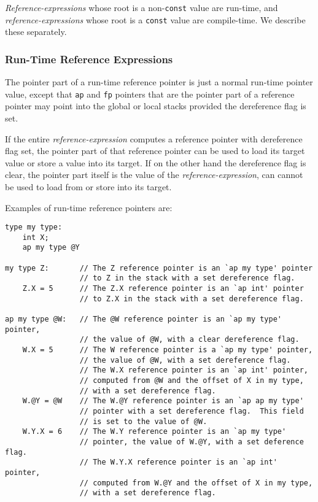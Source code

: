 \documentclass[12pt]{article}
\newenvironment{indpar}[1][0.3in]%
	{\begin{list}{}%
		     {\setlength{\itemsep}{0in}%
		      \setlength{\topsep}{0in}%
		      \setlength{\parsep}{1ex}%
		      \setlength{\labelwidth}{#1}%
		      \setlength{\leftmargin}{#1}%
		      \addtolength{\leftmargin}{\labelsep}}%
	 \item}%
	{\end{list}}
\begin{document}
{\em Reference-expressions} whose root is a non-{\tt const} value are
run-time, and {\em reference-expres\-sions}
whose root is a {\tt const} value are compile-time.
We describe these separately.

\subsubsection{Run-Time Reference Expressions}
\label{RUN-TIME-REFERENCE-EXPRESSIONS}

The pointer part of a run-time reference pointer is just
a normal run-time pointer value, except that
{\tt ap} and {\tt fp} pointers that are the pointer part
of a reference pointer may point
into the global or local stacks provided the dereference flag is set.

If the entire {\em reference-expression} computes a reference pointer
with dereference flag set, the pointer part of that reference pointer
can be used to load its target value or store a value into its target.
If on the other hand the dereference flag is clear, the pointer part
itself is the value of the {\em reference-expression}, can cannot
be used to load from or store into its target.

Examples of run-time reference pointers are:
\begin{indpar}\small\begin{verbatim}
type my type:
    int X;
    ap my type @Y

my type Z:       // The Z reference pointer is an `ap my type' pointer
                 // to Z in the stack with a set dereference flag.
    Z.X = 5      // The Z.X reference pointer is an `ap int' pointer
                 // to Z.X in the stack with a set dereference flag.

ap my type @W:   // The @W reference pointer is an `ap my type' pointer,
                 // the value of @W, with a clear dereference flag.
    W.X = 5      // The W reference pointer is a `ap my type' pointer,
                 // the value of @W, with a set dereference flag.
                 // The W.X reference pointer is an `ap int' pointer,
                 // computed from @W and the offset of X in my type,
                 // with a set dereference flag.
    W.@Y = @W    // The W.@Y reference pointer is an `ap ap my type'
                 // pointer with a set dereference flag.  This field
                 // is set to the value of @W.
    W.Y.X = 6    // The W.Y reference pointer is an `ap my type'
                 // pointer, the value of W.@Y, with a set deference flag.
                 // The W.Y.X reference pointer is an `ap int' pointer,
                 // computed from W.@Y and the offset of X in my type,
                 // with a set dereference flag.
\end{verbatim}\end{indpar}
\end{document}
